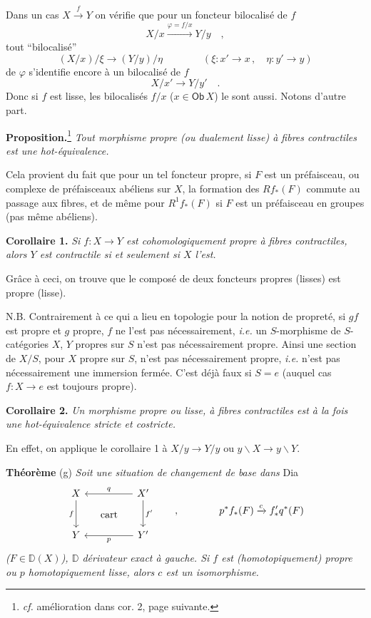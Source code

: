 \documentclass[11pt]{article}
\newcommand{\printedpage}[1]{\marginpar{\footnotesize p.~#1}}
\newcommand{\msp}[1]{\marginpar{\footnotesize [#1]}}
\newcommand{\Ob}{\mathsf{Ob}}
\newcommand{\DD}{\mathbb{D}}
\begin{document}
Dans un cas $X \xrightarrow{f} Y$ on vérifie que pour un foncteur bilocalisé de $f$
\[
X/x \xrightarrow{\varphi=f/x} Y/y \quad ,
\]
tout ``bilocalisé''
\[
(X/x)/\xi \longrightarrow (Y/y)/\eta \qquad\qquad (\xi : x' \to x\,, \quad \eta : y' \to y)
\]
de $\varphi$ s'identifie encore à un bilocalisé de $f$
\[
X/x' \longrightarrow Y/y' \quad .
\]
Donc si $f$ est lisse, les bilocalisés $f/x$ ($x \in \Ob\, X$) le sont aussi. Notons d'autre part.

\noindent\textbf{Proposition.}\footnote[24]{\textit{cf.} amélioration dans cor. 2, page suivante.} \textit{Tout morphisme propre (ou dualement lisse) à fibres contractiles est une hot-équivalence.}

\noindent\msp{page 56}
Cela provient du fait que pour un tel foncteur propre, si $F$ est un préfaisceau, ou complexe de préfaisceaux abéliens sur $X$, la formation des $Rf_*(F)$ commute au passage aux fibres, et de même pour $R^1f_*(F)$ si $F$ est un préfaisceau en groupes (pas même abéliens).

\noindent\textbf{Corollaire 1.} \textit{Si $f : X \to Y$ est cohomologiquement propre à fibres contractiles, alors $Y$ est contractile si et seulement si $X$ l'est.}

Grâce à ceci, on trouve que le composé de deux foncteurs propres (lisses) est propre (lisse).

\printedpage{32}

\noindent N.B. Contrairement à ce qui a lieu en topologie pour la notion de propreté, si $gf$ est propre et $g$ propre, $f$ ne l'est pas nécessairement, \textit{i.e.} un $S$-morphisme de $S$-catégories $X$, $Y$ propres sur $S$ n'est pas nécessairement propre. Ainsi une section de $X/S$, pour $X$ propre sur $S$, n'est pas nécessairement propre, \textit{i.e.} n'est pas nécessairement une immersion fermée. C'est déjà faux si $S = e$ (auquel cas $f : X \to e$ est toujours propre).

\noindent\textbf{Corollaire 2.} \textit{Un morphisme propre ou lisse, à fibres contractiles est à la fois une hot-équivalence stricte et costricte.}

En effet, on applique le corollaire 1 à $X/y \to Y/y$ ou $y\backslash X \to y\backslash Y$.

\noindent\textbf{Théorème} (g) \textit{Soit une situation de changement de base dans} \textsf{Dia}
\[
\begin{tikzcd}[row sep=large, column sep=huge]
X \arrow[d, "f"'] \arrow[dr, phantom, "\text{cart}"] & X' \arrow[l, "q"'] \arrow[d, "f'"] \\
Y & Y' \arrow[l, "p"]
\end{tikzcd}
\qquad , \qquad\qquad p^*f_*(F) \xrightarrow{c} f'_*q^*(F)
\]
\textit{($F \in \DD(X)$), $\DD$ dérivateur exact à gauche. Si $f$ est (homotopiquement) propre ou $p$ homotopiquement lisse, alors $c$ est un isomorphisme.}
\end{document}
